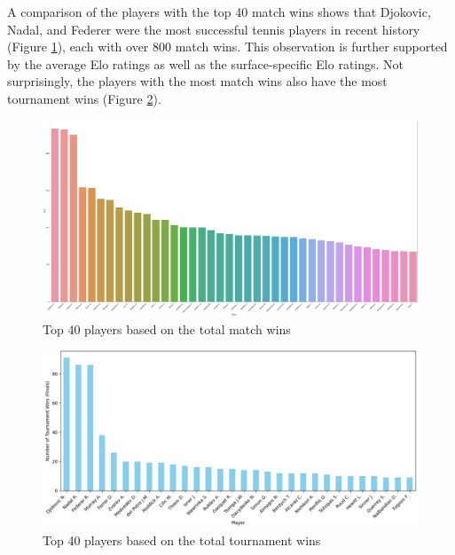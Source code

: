 \documentclass[preprint,aps,nofootinbib,a4paper,superscriptaddress,longbibliography,amsfonts,amssymb,amsmath,titlepage]{revtex4-2}
\begin{document}
A comparison of the players with the top 40 match wins shows that Djokovic, Nadal, and Federer were the most successful tennis players in recent history (Figure \ref{top-40-players-match-wins}), each with over 800 match wins. This observation is further supported by the average Elo ratings as well as the surface-specific Elo ratings. Not surprisingly, the players with the most match wins also have the most tournament wins (Figure \ref{top-40-players-tournament-wins}).
%
\begin{figure}[h]
\includegraphics[width=\textwidth]{pictures/top-40-players-match-wins.png}
\caption{Top 40 players based on the total match wins}
\label{top-40-players-match-wins}
\end{figure}
%
%
\begin{figure}[h]
\includegraphics[width=\textwidth]{pictures/top-40-players-tournament-wins.png}
\caption{Top 40 players based on the total tournament wins}
\label{top-40-players-tournament-wins}
\end{figure}
%
\end{document}
